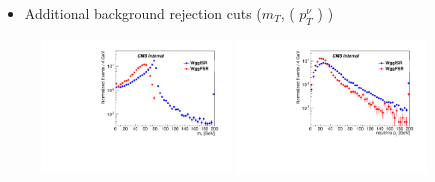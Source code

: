 \documentclass{beamer}
\begin{document}
 {
    
    \begin{itemize}
        \item Additional background rejection cuts ($m_{T}$, \met ( $p_{T}^{\nu}$ ) )
    \end{itemize}

    \begin{figure}
        \includegraphics[width=0.45\textwidth]{Plots/mt_1l2poverlap.pdf}
        \includegraphics[width=0.45\textwidth]{Plots/met_1l2poverlap.pdf}
    \end{figure}

}
\end{document}
